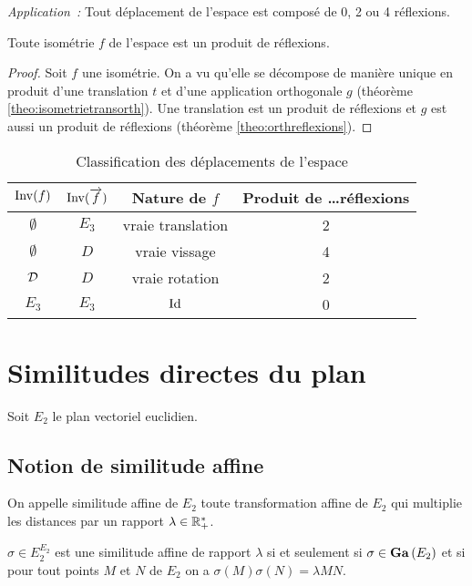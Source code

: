 \emph{Application~:} Tout déplacement de l'espace est composé de 0, 2 ou 4 réflexions.

\begin{cor}
  Toute isométrie \(f\) de l'espace est un produit de réflexions.
\end{cor}
\begin{proof}
  Soit \(f\) une isométrie. On a vu qu'elle se décompose de manière unique en produit d'une translation \(t\) et d'une application orthogonale \(g\) (théorème
\ref{theo:isometrietransorth}). Une translation est un produit de réflexions et \(g\) est aussi un produit de réflexions (théorème
\ref{theo:orthreflexions}).
\end{proof}

\begin{table}
  \centering
  \begin{tabular}{|c|c|c|c|}\hline
    \(\operatorname{Inv}(f)\) & \(\operatorname{Inv}(\overrightarrow{f})\) & Nature de \(f\) & Produit de \ldots réflexions \\ \hline
    \(\emptyset\) & \(E_3\) & vraie translation & 2 \\
    \(\emptyset\) & \(D\) & vraie vissage & 4 \\
    \(\mathcal{D}\) & \(D\)& vraie rotation & 2 \\
    \(E_3\) & \(E_3\) & \(\operatorname{Id}\) & 0 \\ \hline
  \end{tabular}
  \caption{Classification des déplacements de l'espace}
  \label{tab:classdéplacementsespace}
\end{table}

\section{Similitudes directes du plan}

Soit \(E_2\) le plan vectoriel euclidien.

\subsection{Notion de similitude affine}

\begin{defdef}
  On appelle similitude affine de \(E_2\) toute transformation affine de \(E_2\) qui multiplie les distances par un rapport \(\lambda \in \mathbb{R}_{+}^{*}\).

  \(\sigma \in E_2^{E_2}\) est une similitude affine de rapport \(\lambda\) si et seulement si \(\sigma \in \mathbf{Ga}\left(E_2\right)\) et si pour tout points \(M\) et \(N\) de \(E_2\) on a \(\sigma(M)\sigma(N)=\lambda MN\).
\end{defdef}

